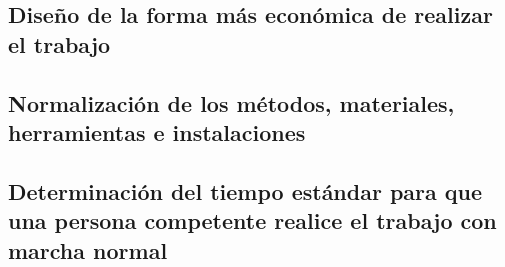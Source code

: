     \subsection{Diseño de la forma más económica de realizar el trabajo}
    
    \subsection{Normalización de los métodos, materiales, herramientas e instalaciones}
    
    \subsection{Determinación del tiempo estándar para que una persona competente realice el trabajo con marcha normal}
    
    
    
    
    
